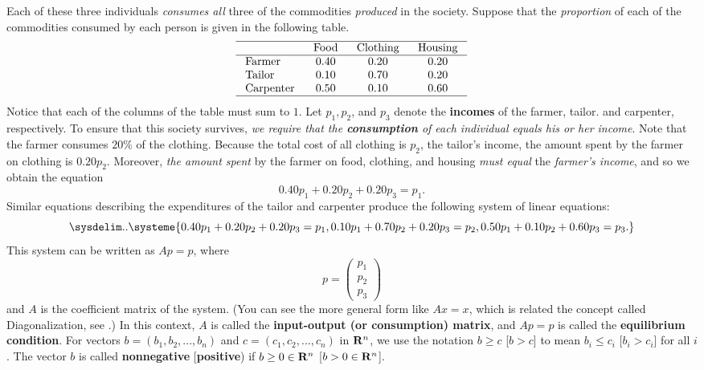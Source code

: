 Each of these three individuals \emph{consumes all} three of the commodities \emph{produced} in the society.
Suppose that the \emph{proportion} of each of the commodities consumed by each person is given in the following table.
\[
    \begin{array}{lccc}
        \hline & \text { Food } & \text { Clothing } & \text { Housing } \\
        \hline \text { Farmer } & 0.40 & 0.20 & 0.20 \\
        \text { Tailor } & 0.10 & 0.70 & 0.20 \\
        \text { Carpenter } & 0.50 & 0.10 & 0.60 \\
        \hline
    \end{array}
\]
Notice that each of the columns of the table must sum to \(1\).
Let \(p_1, p_2\), and \(p_3\) denote the \textbf{incomes} of the farmer, tailor. and carpenter, respectively.
To ensure that this society survives, \emph{we require that the \textbf{consumption} of each individual equals his or her income}.
Note that the farmer consumes \(20\)\% of the clothing.
Because the total cost of all clothing is \(p_2\), the tailor's income, the amount spent by the farmer on clothing is \(0.20 p_2\).
Moreover, \emph{the amount spent} by the farmer on food, clothing, and housing \emph{must equal} the \emph{farmer's income}, and so we obtain the equation
\[
    0.40 p_1 + 0.20 p_2 + 0.20 p_3 = p_1.
\]
Similar equations describing the expenditures of the tailor and carpenter produce the following system of linear equations:
\[
    \sysdelim..\systeme{
        0.40 p_1 + 0.20 p_2 + 0.20 p_3 = p_1,
        0.10 p_1 + 0.70 p_2 + 0.20 p_3 = p_2,
        0.50 p_1 + 0.10 p_2 + 0.60 p_3 = p_3.
    }
\]
This system can be written as \(Ap = p\), where
\[
    p = \begin{pmatrix} p_1 \\ p_2 \\ p_3 \end{pmatrix}
\]
and \(A\) is the coefficient matrix of the system.
(You can see the more general form like \(Ax = x\), which is related the concept called Diagonalization, see .)
In this context, \(A\) is called the \textbf{input-output (or consumption) matrix}, and \(Ap = p\) is called the \textbf{equilibrium condition}.
For vectors \(b = (b_1, b_2, ..., b_n)\) and \(c = (c_1, c_2, ..., c_n)\) in \(\mathbf{R}^n\), we use the notation \(b \ge c\) [\(b > c\)] to mean \(b_i \le c_i\) [\(b_i > c_i\)] for all \(i\).
The vector \(b\) is called \textbf{nonnegative} [\textbf{positive}) if \(b \ge 0 \in \mathbf{R}^n\) [\(b > 0 \in \mathbf{R}^n\)].

